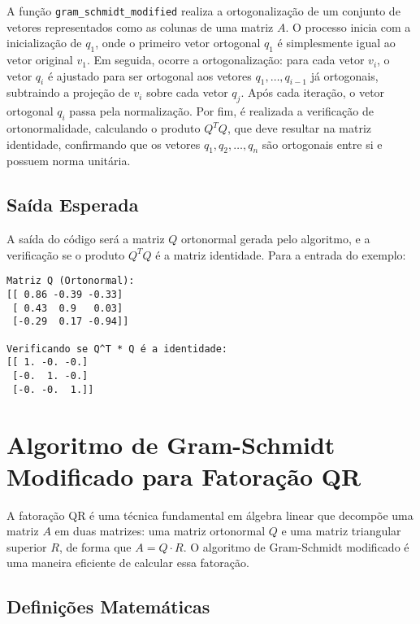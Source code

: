 A função \texttt{gram\_schmidt\_modified} realiza a ortogonalização de um conjunto de vetores representados como as colunas de uma matriz \( A \). O processo inicia com a inicialização de \( q_1 \), onde o primeiro vetor ortogonal \( q_1 \) é simplesmente igual ao vetor original \( v_1 \). Em seguida, ocorre a ortogonalização: para cada vetor \( v_i \), o vetor \( q_i \) é ajustado para ser ortogonal aos vetores \( q_1, \dots, q_{i-1} \) já ortogonais, subtraindo a projeção de \( v_i \) sobre cada vetor \( q_j \). Após cada iteração, o vetor ortogonal \( q_i \) passa pela normalização. Por fim, é realizada a verificação de ortonormalidade, calculando o produto \( Q^T Q \), que deve resultar na matriz identidade, confirmando que os vetores \( q_1, q_2, \dots, q_n \) são ortogonais entre si e possuem norma unitária.


\subsection{Saída Esperada}

A saída do código será a matriz \( Q \) ortonormal gerada pelo algoritmo, e a verificação se o produto \( Q^T Q \) é a matriz identidade. Para a entrada do exemplo:

\begin{lstlisting}
Matriz Q (Ortonormal):
[[ 0.86 -0.39 -0.33]
 [ 0.43  0.9   0.03]
 [-0.29  0.17 -0.94]]

Verificando se Q^T * Q é a identidade:
[[ 1. -0. -0.]
 [-0.  1. -0.]
 [-0. -0.  1.]]
\end{lstlisting}

\section{Algoritmo de Gram-Schmidt Modificado para Fatoração QR}

A fatoração QR é uma técnica fundamental em álgebra linear que decompõe uma matriz \( A \) em duas matrizes: uma matriz ortonormal \( Q \) e uma matriz triangular superior \( R \), de forma que \( A = Q \cdot R \). O algoritmo de Gram-Schmidt modificado é uma maneira eficiente de calcular essa fatoração.

\subsection{Definições Matemáticas}

